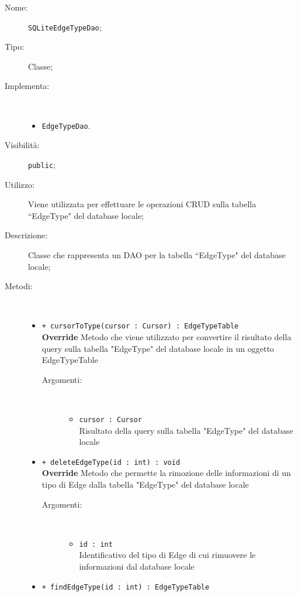 \documentclass[../DefinizioneDiProdotto.tex]{subfiles}
\begin{document}
    \begin{description}
\item[Nome:] \texttt{SQLiteEdgeTypeDao};
\item[Tipo:] Classe;
\item[Implementa:] \
\begin{itemize}
\item \texttt{EdgeTypeDao}.

\end{itemize}
\item[Visibilità:] \texttt{public};
\item[Utilizzo:] Viene utilizzata per effettuare le operazioni CRUD sulla tabella “EdgeType" del database locale;
\item[Descrizione:] Classe che rappresenta un DAO per la tabella “EdgeType" del database locale;
\item[Metodi:] \
\begin{itemize}
\item \texttt{+ cursorToType(cursor : Cursor) : EdgeTypeTable}\\
\textbf{Override} Metodo che viene utilizzato per convertire il risultato della query sulla tabella "EdgeType" del database locale in un oggetto EdgeTypeTable
 \begin{description}
\item[Argomenti:] \
\begin{itemize}
\item \texttt{cursor : Cursor}\\
Risultato della query sulla tabella "EdgeType" del database locale\end{itemize}
\end{description}
\item \texttt{+ deleteEdgeType(id : int) : void}\\
\textbf{Override} Metodo che permette la rimozione delle informazioni di un tipo di Edge dalla tabella "EdgeType" del database locale
 \begin{description}
\item[Argomenti:] \
\begin{itemize}
\item \texttt{id : int}\\
Identificativo del tipo di Edge di cui rimuovere le informazioni dal database locale\end{itemize}
\end{description}
\item \texttt{+ findEdgeType(id : int) : EdgeTypeTable}\\

\end{itemize}
\end{description}
\end{document}
